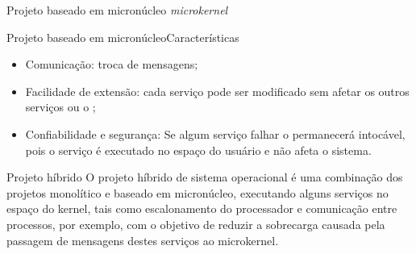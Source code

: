 \begin{frame}{Projeto baseado em micronúcleo {\em microkernel}}
\begin{center}
\end{center}
\end{frame}

\begin{frame}{Projeto baseado em micronúcleo}{Características}
  \begin{itemize}
    \item Comunicação: troca de mensagens;
    \item Facilidade de extensão: cada serviço pode ser modificado sem
      afetar os outros serviços ou o \so{};
    \item Confiabilidade e segurança: Se algum serviço falhar o \so{}
      permanecerá intocável, pois o serviço é executado no espaço do
      usuário e não afeta o sistema.
  \end{itemize}
\end{frame}

\begin{frame}{Projeto híbrido}
  O projeto híbrido de sistema operacional é uma combinação dos
  projetos monolítico e baseado em micronúcleo, executando alguns
  serviços no espaço do kernel, tais como escalonamento do processador
  e comunicação entre processos, por exemplo, com o objetivo de reduzir a
  sobrecarga causada pela passagem de mensagens destes serviços ao
  microkernel.
\end{frame}

